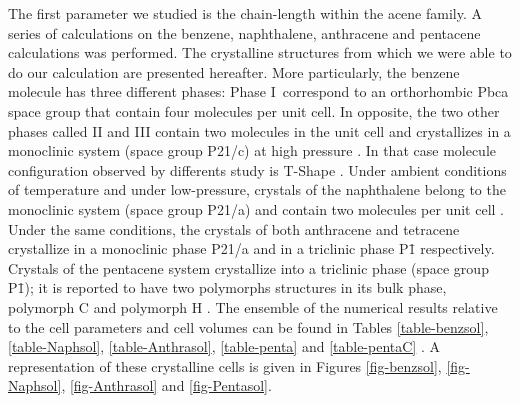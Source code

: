  The first parameter we studied is the chain-length within the acene family. A series of calculations on the benzene, naphthalene, anthracene and pentacene calculations was performed. The crystalline structures from which we were able to do our calculation are presented hereafter. More particularly, the benzene molecule has three different phases: Phase I correspond to an orthorhombic Pbca space group that contain four molecules per unit cell. In opposite, the two other phases called II and III contain two molecules in the unit cell and crystallizes in a monoclinic system (space group P21/c) at high pressure \cite{meijer1996density,katrusiak2010association}. In that case molecule configuration observed by differents study is T-Shape \cite{katrusiak2010association}. Under ambient conditions of temperature and under low-pressure, crystals of the naphthalene belong to the monoclinic system (space group P21/a) and contain two molecules per unit cell \cite{fabbiani2006exploration}. Under the same conditions, the crystals of both anthracene and tetracene crystallize in a monoclinic phase P21/a \cite{brock1990temperature} and in a triclinic phase P\={1} \cite{sondermann1985x} respectively. Crystals of the pentacene system crystallize into a triclinic phase (space group P\={1}); it is reported to have two polymorphs structures in its bulk phase, polymorph C \cite{campbell1961crystal} and polymorph H \cite{mattheus2001polymorphism}. The ensemble of the numerical results relative to the cell parameters and cell volumes can be found in Tables \ref{table-benzsol}, \ref{table-Naphsol}, \ref{table-Anthrasol}, \ref{table-penta} and \ref{table-pentaC} . A representation of these crystalline cells is given in Figures \ref{fig-benzsol}, \ref{fig-Naphsol}, \ref{fig-Anthrasol} and  \ref{fig-Pentasol}.
 
